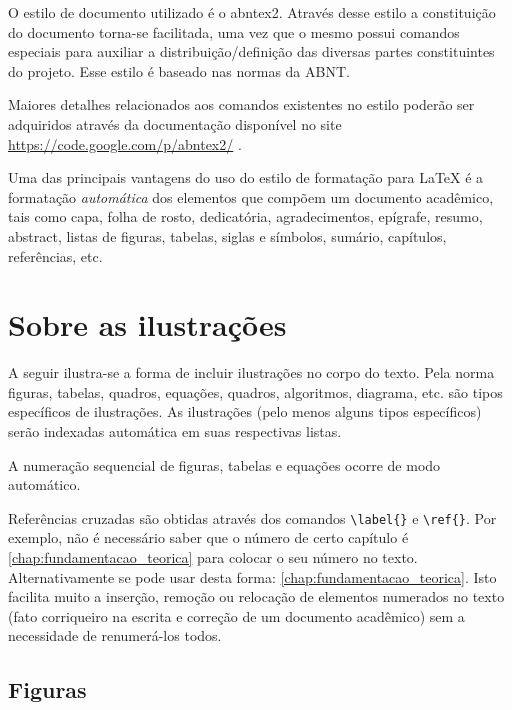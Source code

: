 \begin{apendicesenv}
O estilo de documento utilizado é o {\ttfamily abntex2}.
Através desse estilo a constituição do documento torna-se facilitada, uma vez que o mesmo possui comandos especiais para auxiliar a distribuição/definição das diversas partes constituintes do projeto.
Esse estilo é baseado nas normas da ABNT.

Maiores detalhes relacionados aos comandos existentes no estilo poderão ser adquiridos através da documentação disponível no site \href{https://code.google.com/p/abntex2/}{https://code.google.com/p/abntex2/} \cite{abnTeX22014b}.

Uma das principais vantagens do uso do estilo de formatação para \LaTeX{}  é a formatação \textit{automática} dos elementos que compõem um documento acadêmico, tais como capa, folha de rosto, dedicatória, agradecimentos, epígrafe, resumo, abstract, listas de figuras, tabelas, siglas e símbolos, sumário, capítulos, referências, etc.


\chapter{Sobre as ilustrações}
\label{chap:sobre_as_ilustracoes}

A seguir ilustra-se a forma de incluir ilustrações no corpo do texto. Pela norma figuras, tabelas, quadros, equações, quadros, algoritmos, diagrama, etc. são tipos específicos de ilustrações. As ilustrações (pelo menos alguns tipos específicos) serão indexadas automática em suas respectivas listas.

A numeração sequencial de figuras, tabelas e equações ocorre de modo automático.

Referências cruzadas são obtidas através dos comandos \verb|\label{}| e \verb|\ref{}|. Por exemplo, não é necessário saber que o número de certo capítulo é \ref{chap:fundamentacao_teorica} para colocar o seu número no texto. Alternativamente se pode usar desta forma: \autoref{chap:fundamentacao_teorica}. Isto facilita muito a inserção, remoção ou relocação de elementos numerados no texto (fato corriqueiro na escrita e correção de um documento acadêmico) sem a necessidade de renumerá-los todos.

\section{Figuras}
\label{sec:figuras}


\end{apendicesenv}
